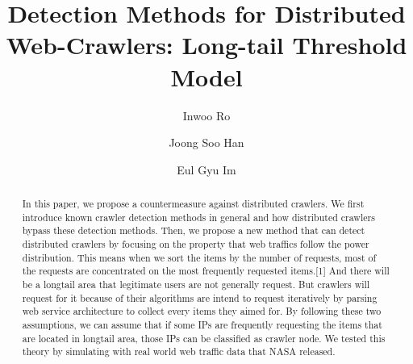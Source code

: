 \documentclass[sigconf,anonymous=true]{acmart}
\begin{document}
\title{Detection Methods for Distributed Web-Crawlers: Long-tail Threshold Model}

\author{Inwoo Ro}

\author{Joong Soo Han}

\author{Eul Gyu Im}



\begin{abstract}
In this paper, we propose a countermeasure against distributed crawlers. We first introduce known crawler detection methods in general and how distributed crawlers bypass these detection methods. Then, we propose a new method that can detect distributed crawlers by focusing on the property that web traffics follow the power distribution. This means when we sort the items by the number of requests, most of the requests are concentrated on the most frequently requested items.[1] And there will be a longtail area that legitimate users are not generally request. But crawlers will request for it because of their algorithms are intend to request iteratively by parsing web service architecture to collect every items they aimed for. By following these two assumptions, we can assume that if some IPs are frequently requesting the items that are located in longtail area, those IPs can be classified as crawler node. We tested this theory by simulating with real world web traffic data that NASA released.
\end{abstract}



\maketitle
\end{document}
